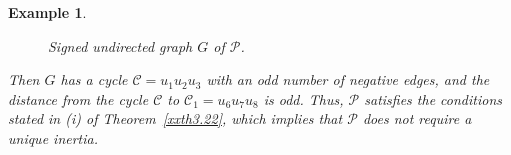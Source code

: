 \documentclass[a4paper, 10pt]{article}
\newtheorem{eg}{Example}[section]
\numberwithin{equation}{section}
\def\sgn{{\rm sgn}}
\def\In{{\rm In}}
\begin{document}
\begin{eg}
\begin{figure}[H]
		\caption{Signed undirected graph $G$ of $\mathcal{P}$.}
		\label{xnfig5.1}
	\end{figure}
	Then $G$ has a cycle $\mathcal{C}=u_1u_2u_3$ with an odd number of negative edges, and the distance from the cycle $\mathcal{C}$ to $\mathcal{C}_1=u_6u_7u_8$ is odd. Thus, $\mathcal{P}$ satisfies the conditions stated in (i) of Theorem~\ref{xxth3.22}, which implies that $\mathcal{P}$ does not require a unique inertia.
\end{eg}
\end{document}
